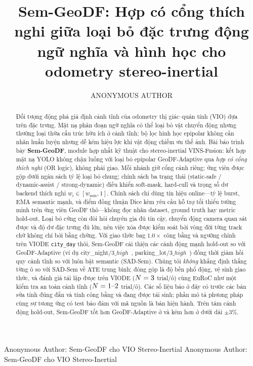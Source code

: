 \documentclass{ieeeaccess}
\begin{document}

\title{Sem-GeoDF: Hợp có cổng thích nghi giữa loại bỏ đặc trưng động ngữ nghĩa và hình học cho odometry stereo-inertial}

\author{\uppercase{Anonymous Author}}

\address[1]{Đơn vị công bố tạm ẩn (bản nháp IEEE Access).}


\markboth
{Anonymous Author: Sem-GeoDF cho VIO Stereo-Inertial}
{Anonymous Author: Sem-GeoDF cho VIO Stereo-Inertial}


\begin{abstract}
Đối tượng động phá giả định cảnh tĩnh của odometry thị giác--quán tính (VIO) dựa trên đặc trưng.
Mặt nạ phân đoạn ngữ nghĩa có thể loại bỏ vật chuyển động nhưng thường loại thừa cấu trúc hữu ích ở cảnh tĩnh; bộ lọc hình học epipolar không cần nhãn huấn luyện nhưng dễ kém hiệu lực khi vật động chiếm ưu thế ảnh.
Bài báo trình bày \textbf{Sem-GeoDF}, module hợp nhất kỹ thuật cho stereo-inertial VINS-Fusion: kết hợp mặt nạ YOLO không chặn luồng với loại bỏ epipolar GeoDF-Adaptive qua \emph{hợp có cổng thích nghi} (OR logic), không phải giao.
Mỗi nhánh giữ cổng cảnh riêng; ứng viên được gộp dưới ngân sách tỷ lệ loại bỏ chung; chính sách ba trạng thái (static-safe / dynamic-assist / strong-dynamic) điều khiển soft-mask, hard-cull và trọng số dư backend thích nghi \(w_i\in[w_{\min},1]\).
Chính sách chỉ dùng tín hiệu online---tỷ lệ burst, EMA semantic mạnh, và điểm đồng thuận Dice kèm yêu cầu hỗ trợ tối thiểu tường minh trên ứng viên GeoDF thô---không đọc nhãn dataset, ground truth hay metric hold-out. Loại bỏ cứng còn đòi hỏi chuyên gia đủ tin cậy, chuyển động camera quan sát được và độ dư đặc trưng đủ lớn, nên việc xóa được kiểm soát bởi vòng đời từng track chứ không chỉ bởi bằng chứng.
Với giao thức bag \(1.0\times\) công bằng và ngưỡng chỉnh trên VIODE \texttt{city\_day} thôi, Sem-GeoDF cải thiện các cảnh động mạnh hold-out so với GeoDF-Adaptive (ví dụ city\_night/\(3\_high\)~\DeltaCityNightHigh, parking\_lot/\(3\_high\)~\DeltaParkingHigh) đồng thời giảm hồi quy cảnh tĩnh so với luôn bật semantic (SAD-Sem).
Chúng tôi \emph{không} khẳng định thắng từng ô so với SAD-Sem về ATE trung bình; đóng góp là độ bền phổ động, vệ sinh giao thức, và đánh giá tái lập được trên VIODE (\(N=3\) trial/ô) cùng EuRoC như một kiểm tra an toàn cảnh tĩnh (\(N=\mbox{1--2}\) trial/ô). Các số liệu báo ở đây có trước các bản sửa tính đúng đắn và tính công bằng và đang được tái sinh; phần mô tả phương pháp cùng sự tương ứng có test bảo đảm với mã nguồn là bản hiện hành.
Trên tám cảnh động hold-out, Sem-GeoDF tốt hơn GeoDF-Adaptive ở \HoldoutBetter{} và kém hơn ở \HoldoutWorse{} dưới dải \(\pm3\%\).
\end{abstract}
\end{document}
